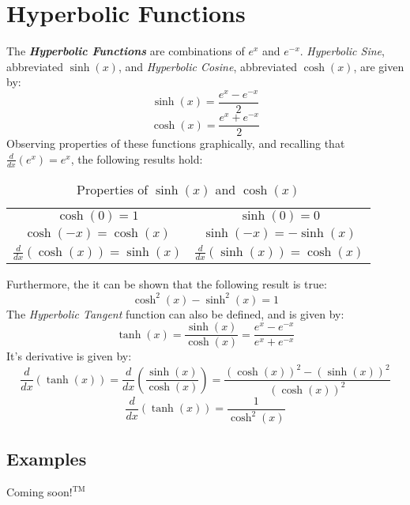 \section{Hyperbolic Functions}
The \textbf{\textit{Hyperbolic Functions}} are combinations of $e^x$ and $e^{-x}$. \textit{Hyperbolic Sine}, abbreviated $\sinh(x)$, and \textit{Hyperbolic Cosine}, abbreviated $\cosh(x)$, are given by:
%
\begin{equation}
\label{eq:sinh}
\sinh(x) = \frac{e^x - e^{-x}}{2}
\end{equation}
%
\begin{equation}
\label{eq:cosh}
\cosh(x) = \frac{e^x + e^{-x}}{2}
\end{equation}
%
Observing properties of these functions graphically, and recalling that $\frac{d}{dx}\left(e^x\right) = e^x$, the following results hold:
\begin{table}[H]
\begin{center}
\caption{Properties of $\sinh(x)$ and $\cosh(x)$}
\begin{tabular}{c|c}
$\cosh(0) = 1$ & $\sinh(0) = 0$\\
$\cosh(-x) = \cosh(x)$ & $\sinh(-x) = -\sinh(x)$\\
$\frac{d}{dx}\left(\cosh(x)\right) = \sinh(x)$ & $\frac{d}{dx}\left(\sinh(x)\right) = \cosh(x)$
\end{tabular}
\end{center}
\end{table}
%
Furthermore, the it can be shown that the following result is true:
%
\begin{equation}
\cosh^2(x) - \sinh^2(x) = 1
\end{equation}
%
The \textit{Hyperbolic Tangent} function can also be defined, and is given by:
%
\begin{equation}
\tanh(x) = \frac{\sinh(x)}{\cosh(x)} = \frac{e^x - e^{-x}}{e^x + e^{-x}}
\end{equation}
%
It's derivative is given by:
%
\begin{equation}
\frac{d}{dx}\left(\tanh(x)\right) = \frac{d}{dx}\left(\frac{\sinh(x)}{\cosh(x)}\right) = \frac{\left(\cosh(x)\right)^2 - \left(\sinh(x)\right)^2}{\left(\cosh(x)\right)^2}
\end{equation}
%
\begin{equation}
\frac{d}{dx}\left(\tanh(x)\right) = \frac{1}{\cosh^2(x)}
\end{equation}
%
\begin{center}
\section*{\small Examples}
Coming soon$!^{\text{TM}}$
\end{center}


